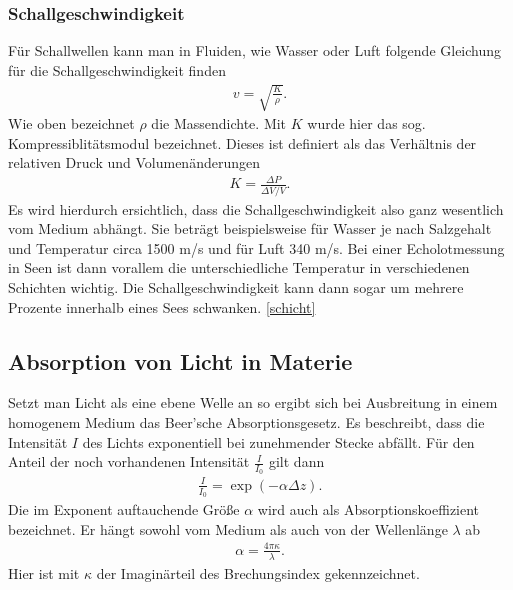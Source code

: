 \documentclass[12pt,a4paper,titlepage,headinclude,bibtotoc]{scrartcl}
\begin{document}
\subsubsection{Schallgeschwindigkeit}
Für Schallwellen kann man in Fluiden, wie Wasser oder Luft folgende Gleichung für die Schallgeschwindigkeit finden
\begin{align}
 v = \sqrt{  \frac{K}{\rho}  }.
\end{align}
Wie oben bezeichnet $\rho$ die Massendichte. Mit $K$ wurde hier das sog. Kompressiblitätsmodul bezeichnet. Dieses ist definiert als das Verhältnis der relativen Druck und Volumenänderungen \cite{tipler}
\begin{align}
 K =  \frac{\Delta P}{\Delta V / V }.
\end{align}
Es wird hierdurch ersichtlich, dass die Schallgeschwindigkeit also ganz wesentlich vom Medium abhängt. 
Sie beträgt beispielsweise für Wasser je nach Salzgehalt und Temperatur circa 1500 m/s  und für Luft 340 m/s.
Bei einer Echolotmessung in Seen ist dann vorallem die unterschiedliche Temperatur in verschiedenen Schichten 
wichtig. Die Schallgeschwindigkeit kann dann sogar um mehrere Prozente innerhalb eines Sees schwanken.
\ref{schicht} %



\subsection{Absorption von Licht in Materie}
Setzt man Licht als eine ebene Welle an so ergibt sich bei Ausbreitung in einem homogenem Medium das Beer'sche Absorptionsgesetz.
Es beschreibt, dass die Intensität $I$ des Lichts exponentiell bei zunehmender Stecke abfällt.
Für den Anteil der noch vorhandenen Intensität $\frac{I}{I_0}$ gilt dann
\begin{align}
 \frac{I}{I_0}  =  \exp(- \alpha  \Delta z).
\end{align}
Die im Exponent auftauchende Größe $\alpha$ wird auch als Absorptionskoeffizient bezeichnet. Er hängt sowohl vom Medium als auch von der Wellenlänge $\lambda$ ab
\begin{align}
 \alpha= \frac{4 \pi \kappa}{\lambda}.
\end{align}
Hier ist mit $\kappa$ der Imaginärteil des Brechungsindex gekennzeichnet.
\cite[S.229]{meschede}
\end{document}
